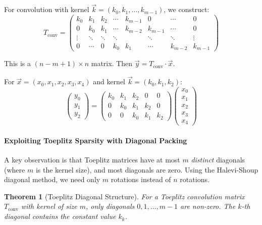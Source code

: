\documentclass[11pt,a4paper]{article}
\newtheorem{theorem}{Theorem}
\begin{document}
For convolution with kernel $\vec{k} = (k_0, k_1, \ldots, k_{m-1})$, we construct:
\[
T_{\text{conv}} = \begin{pmatrix}
k_0 & k_1 & k_2 & \cdots & k_{m-1} & 0 & \cdots & 0 \\
0 & k_0 & k_1 & \cdots & k_{m-2} & k_{m-1} & \cdots & 0 \\
\vdots & \ddots & \ddots & \ddots & & \ddots & \ddots & \vdots \\
0 & \cdots & 0 & k_0 & k_1 & \cdots & k_{m-2} & k_{m-1}
\end{pmatrix}
\]

This is a $(n - m + 1) \times n$ matrix. Then $\vec{y} = T_{\text{conv}} \cdot \vec{x}$.

\begin{example}
For $\vec{x} = (x_0, x_1, x_2, x_3, x_4)$ and kernel $\vec{k} = (k_0, k_1, k_2)$:
\[
\begin{pmatrix}
y_0 \\ y_1 \\ y_2
\end{pmatrix}
=
\begin{pmatrix}
k_0 & k_1 & k_2 & 0 & 0 \\
0 & k_0 & k_1 & k_2 & 0 \\
0 & 0 & k_0 & k_1 & k_2
\end{pmatrix}
\begin{pmatrix}
x_0 \\ x_1 \\ x_2 \\ x_3 \\ x_4
\end{pmatrix}
\]
\end{example}

\paragraph{Exploiting Toeplitz Sparsity with Diagonal Packing}

A key observation is that Toeplitz matrices have at most $m$ \emph{distinct} diagonals (where $m$ is the kernel size), and most diagonals are zero. Using the Halevi-Shoup diagonal method, we need only $m$ rotations instead of $n$ rotations.

\begin{theorem}[Toeplitz Diagonal Structure]
For a Toeplitz convolution matrix $T_{\text{conv}}$ with kernel of size $m$, only diagonals $0, 1, \ldots, m-1$ are non-zero. The $k$-th diagonal contains the constant value $k_k$.
\end{theorem}
\end{document}
